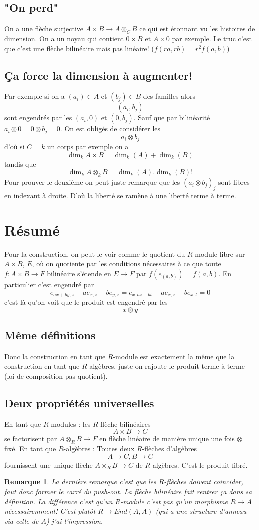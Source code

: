 \documentclass[a4paper,12pt]{article}
\theoremstyle{plain}
\newtheorem{rem}{Remarque}
\theoremstyle{definition}
\theoremstyle{remark}
\begin{document}
\subsection{"On perd"}
On a une flèche surjective $A\times B\to A\otimes_C B$ ce qui est
étonnant vu les histoires de dimension. On a un noyau qui contient
$0\times B$ et $A\times 0$ par exemple. Le truc c'est que c'est
une flèche bilinéaire mais pas linéaire! ($f(ra,rb)=r^2f(a,b)$)

\subsection{Ça force la dimension à augmenter!}
Par exemple si on a 
$(a_i)\in A$ et $(b_j)\in B$ des familles alors 
\[(a_i, b_j)\]
sont engendrés par les $(a_i,0)$ et $(0,b_j)$. Sauf que par 
bilinéarité $a_i\otimes 0=0\otimes b_j=0$. On est obligés de
considérer les 
\[a_i\otimes b_j\]
d'où si $C=k$ un corps par exemple on a 
\[\dim_k A\times B=\dim_k (A)+\dim_k(B)\]
tandis que
\[\dim_k A\otimes_k B=\dim_k(A).\dim_k(B)!\]
Pour prouver le deuxième on peut juste remarque que
les $(a_i\otimes b_j)_j$ sont libres en indexant à droite. D'où
la liberté se ramène à une liberté terme à terme.
\section{Résumé}
Pour la construction, on peut le voir comme le quotient du 
$R$-module libre sur $A\times B$, $E$, où on quotiente par les 
conditions nécessaires à ce que toute $f\colon A\times B\to F$
bilinéaire s'étende en $E\to F$ par $\bar f(e_{(a,b)})=f(a,b)$.
En particulier c'est engendré par 
\[e_{ax+by,z}-ae_{x,z}-be_{y,z}=e_{x,az+bt}-ae_{x,z}-be_{x,t}=0\]
c'est là qu'on voit que le produit est engendré par les
\[x\otimes y\]


\subsection{Même définitions}
Donc la construction en tant que $R$-module est exactement
la même que la construction en tant que $R$-algèbres, juste 
on rajoute le produit terme à terme (loi de composition
pas quotient).
\subsection{Deux propriétés universelles}
En tant que $R$-modules : les $R$-flèche bilinéaires
\[A\times B\to C\]
se factorisent par $A\otimes_R B\to F$ en flèche linéaire de 
manière unique une fois $\otimes$ fixé.
En tant que $R$-algèbres : Toutes deux $R$-flèches d'algèbres
\[A\to C, B\to C\]
fournissent une unique flèche $A\times_R B\to C$ de $R$-algèbres.
C'est le produit fibré. 

\begin{rem}
    La dernière remarque c'est que les $R$-flèches doivent
    coincider, faut donc former le carré du push-out. La flèche
    bilinéaire fait rentrer ça dans sa définition. La différence
    c'est qu'un $R$-module c'est pas qu'un morphisme $R\to A$ 
    nécessairemment! C'est plutôt $R\to End(A,A)$ (qui a une
    structure d'anneau via celle de $A$) j'ai
    l'impression.
\end{rem}
\end{document}
